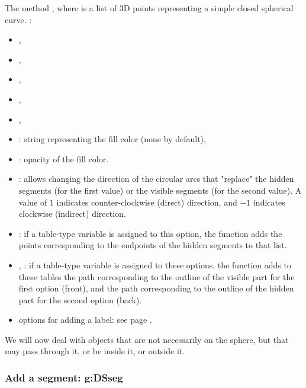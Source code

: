 The method , where  is a list of 3D points representing a simple closed spherical curve. \writeoptions:
\begin{itemize}
    \item {},
    \item {},
    \item {},
    \item {},
    \item {},
    \item {}: string representing the fill color (none by default),
    \item {}: opacity of the fill color. 
    
    \item {}: allows changing the direction of the circular arcs that "replace" the hidden segments (for the first value) or the visible segments (for the second value). A value of $1$ indicates counter-clockwise (direct) direction, and $-1$ indicates clockwise (indirect) direction. 
    
    \item {}: if a table-type variable is assigned to this  option, the function adds the points corresponding to the endpoints of the hidden segments to that list. 
    
    \item {}, : if a table-type variable is assigned to these options, the function adds to these tables the path corresponding to the outline of the visible part for the first option (front), and the path corresponding to the outline of the hidden part for the second option (back).    
    
    \item options for adding a label: see page \pageref{addlabel}.
\end{itemize}

We will now deal with objects that are not necessarily on the sphere, but that may pass through it, or be inside it, or outside it.

\subsubsection{ Add a segment: g:DSseg}

